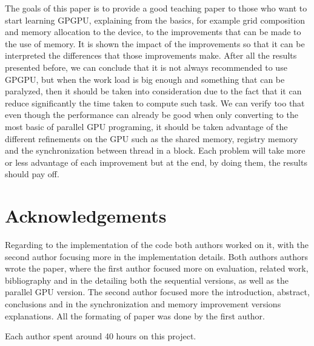 \documentclass[conference]{IEEEtran}
\begin{document}
The goals of this paper is to provide a good teaching paper to those who want to start learning GPGPU, explaining from the basics, for example grid composition and memory allocation to the device, to the improvements that can be made to the use of memory. It is shown the impact of the improvements so that it can be interpreted the differences that those improvements make.
After all the results presented before, we can conclude that it is not always recommended to use GPGPU, but when the work load is big enough and something that can be paralyzed, then it should be taken into consideration due to the fact that it can reduce significantly the time taken to compute such task. We can verify too that even though the performance can already be good when only converting to the most basic of parallel GPU programing, it should be taken advantage of the different refinements on the GPU such as the shared memory, registry memory and the synchronization between thread in a block. Each problem will take more or less advantage of each improvement but at the end, by doing them, the results should pay off.

\section*{Acknowledgements}

Regarding to the implementation of the code both authors worked on it, with the second author focusing more in the implementation details. Both authors authors wrote the paper, where the first author focused more on evaluation, related work, bibliography and in the detailing both the sequential versions, as well as the parallel GPU version. The second author focused more the introduction, abstract, conclusions and in the synchronization and memory improvement versions explanations.
All the formating of paper was done by the first author.

Each author spent around 40 hours on this project.


\end{document}
